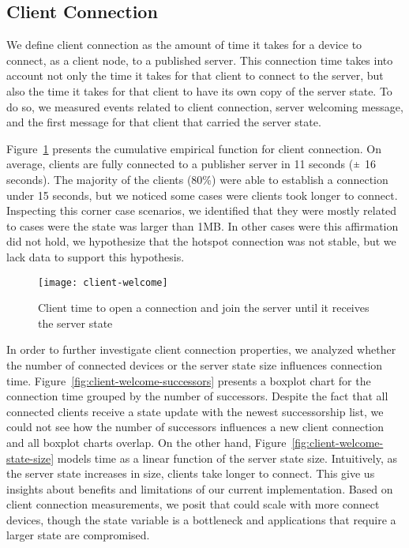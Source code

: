 \subsection{Client Connection}
\label{sub:eval:connection}


We define client connection as the amount of time it takes for a device to connect, as a client node, to a published server.
This connection time takes into account not only the time it takes for that client to connect to the server, 
but also the time it takes for that client to have its own copy of the server state. 
To do so, we measured events related to client connection, server welcoming message, and the first message for that client that carried the server state.


Figure~\ref{fig:client-welcome} presents the cumulative empirical function for client connection.
On average, clients are fully connected to a publisher server in 11 seconds ($\rpm$ 16 seconds). 
The majority of the clients (80\%) were able to establish a connection under 15 seconds, 
but we noticed some cases were clients took longer to connect. 
Inspecting this corner case scenarios, we identified that they were mostly related to cases were the state was larger than 1MB.
In other cases were this affirmation did not hold, we hypothesize that the hotspot connection was not stable, but we lack data to support this hypothesis.


\begin{figure}
    \centering
    \texttt{[image: client-welcome]}
    \caption{Client time to open a connection and join the server until it receives the server state}
    \label{fig:client-welcome}
\end{figure}


In order to further investigate client connection properties, we analyzed whether the number of connected devices or the server state size influences connection time.
Figure~\ref{fig:client-welcome-successors} presents a boxplot chart for the connection time grouped by the number of successors.
Despite the fact that all connected clients receive a state update with the newest successorship list, 
we could not see how the number of successors influences a new client connection and all boxplot charts overlap.
On the other hand, Figure~\ref{fig:client-welcome-state-size} models time as a linear function of the server state size.
Intuitively, as the server state increases in size, clients take longer to connect. 
This give us insights about benefits and limitations of our current implementation.
Based on client connection measurements, we posit that \APIshort could scale with more connect devices, though the state variable is a bottleneck and applications that require a larger state are compromised.


